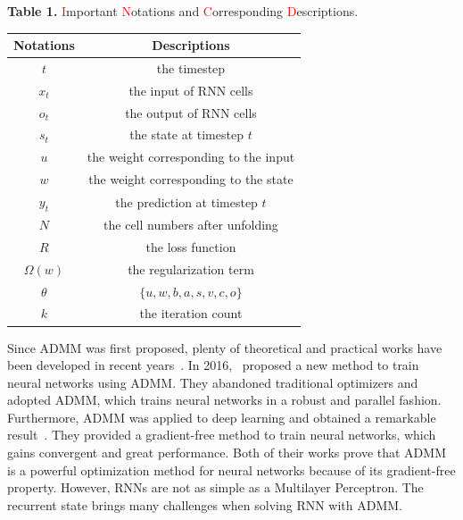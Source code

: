 \documentclass[twoside]{article}
\begin{document}
\begin{multicols}{2}
\tabcolsep 12pt
\renewcommand\arraystretch{1.3}
\begin{center}
{\footnotesize{\bf Table 1.} \textcolor{red}{I}mportant \textcolor{red}{N}otations and \textcolor{red}{C}orresponding \textcolor{red}{D}escriptions.}\\
\vspace{2mm}
\footnotesize{
\begin{tabular*}{\linewidth}{c c}\hline\hline\hline
Notations    & Descriptions  \\
\hline
$t$         & the timestep         \\
$x_t$       & the input of RNN cells    \\
$o_t$       & the output of RNN cells    \\
$s_t$        & the state at timestep $t$    \\
$u$            & the weight corresponding to the input     \\
$w$            & the weight corresponding to the state     \\
$y_t$        & the prediction at timestep $t$   \\
$N$            & the cell numbers after unfolding   \\
$R$            & the loss function     \\
$\Omega(w)$    & the regularization term    \\
$\theta$    & $\{u,w,b,a,s,v,c,o\}$ \\
$k$         & the iteration count       \\
\hline\hline\hline
\end{tabular*}%
}
\label{tab:hyper acc}
\end{center}

Since ADMM was first proposed, plenty of theoretical and practical works have been developed in recent years~\cite{monteiro2010iteration}.
In 2016,~\cite{taylor2016training} proposed a new method to train neural networks using ADMM. They abandoned traditional optimizers and adopted ADMM, which trains neural networks in a robust and parallel fashion. 
Furthermore,  ADMM was applied to deep learning and obtained a remarkable result~\cite{wang2019admm}. They provided a gradient-free method to train neural networks, which gains convergent and great performance. Both of their works prove that ADMM is a powerful optimization method for neural networks because of its gradient-free property. However, RNNs are not as simple as a Multilayer Perceptron. The recurrent state brings many challenges when solving RNN with ADMM. 


\end{multicols}
\end{document}
